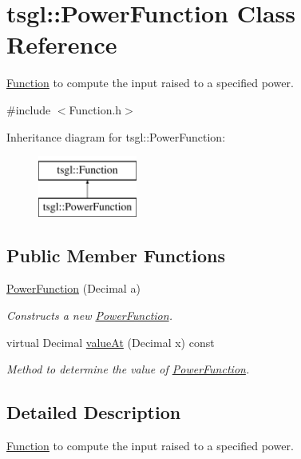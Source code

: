 \hypertarget{classtsgl_1_1_power_function}{}\section{tsgl\+:\+:Power\+Function Class Reference}
\label{classtsgl_1_1_power_function}


\hyperlink{classtsgl_1_1_function}{Function} to compute the input raised to a specified power.  




{\ttfamily \#include $<$Function.\+h$>$}

Inheritance diagram for tsgl\+:\+:Power\+Function\+:\begin{figure}[H]
\begin{center}
\leavevmode
\includegraphics[height=2.000000cm]{classtsgl_1_1_power_function}
\end{center}
\end{figure}
\subsection*{Public Member Functions}
\begin{DoxyCompactItemize}
\item 
\hyperlink{classtsgl_1_1_power_function_a0a5d692e9bc9cf2a176ecab4ffc06519}{Power\+Function} (Decimal a)
\begin{DoxyCompactList}\small\item\em Constructs a new \hyperlink{classtsgl_1_1_power_function}{Power\+Function}. \end{DoxyCompactList}\item 
virtual Decimal \hyperlink{classtsgl_1_1_power_function_ae63821b4c2347508c42c300a0c306076}{value\+At} (Decimal x) const 
\begin{DoxyCompactList}\small\item\em Method to determine the value of \hyperlink{classtsgl_1_1_power_function}{Power\+Function}. \end{DoxyCompactList}\end{DoxyCompactItemize}


\subsection{Detailed Description}
\hyperlink{classtsgl_1_1_function}{Function} to compute the input raised to a specified power. 

